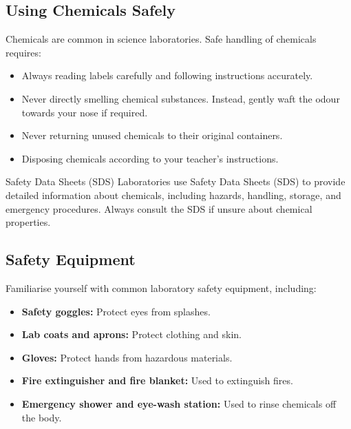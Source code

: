 
\subsection{Using Chemicals Safely}

Chemicals are common in science laboratories. Safe handling of chemicals requires:

\begin{itemize}
    \item Always reading labels carefully and following instructions accurately.
    \item Never directly smelling chemical substances. Instead, gently waft the odour towards your nose if required.
    \item Never returning unused chemicals to their original containers.
    \item Disposing chemicals according to your teacher's instructions.
\end{itemize}

\begin{keyconcept}{Safety Data Sheets (SDS)}
Laboratories use Safety Data Sheets (SDS) to provide detailed information about chemicals, including hazards, handling, storage, and emergency procedures. Always consult the SDS if unsure about chemical properties.
\end{keyconcept}

\subsection{Safety Equipment}

Familiarise yourself with common laboratory safety equipment, including:

\begin{itemize}
    \item \textbf{Safety goggles:} Protect eyes from splashes.
    \item \textbf{Lab coats and aprons:} Protect clothing and skin.
    \item \textbf{Gloves:} Protect hands from hazardous materials.
    \item \textbf{Fire extinguisher and fire blanket:} Used to extinguish fires.
    \item \textbf{Emergency shower and eye-wash station:} Used to rinse chemicals off the body.
\end{itemize}

